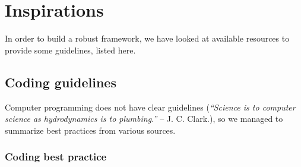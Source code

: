 \documentclass[10pt,letter,twoside]{report}
\begin{document}
\section{Inspirations}
In order to build a robust framework, we have looked at available resources to provide some guidelines, listed here.
		\subsection{Coding guidelines}
		Computer programming does not have clear guidelines (\textit{“Science is to computer science as hydrodynamics is to plumbing.”} -- J. C. Clark.), so we managed to summarize best practices from various sources.
		\subsubsection{Coding best practice}
\end{document}
